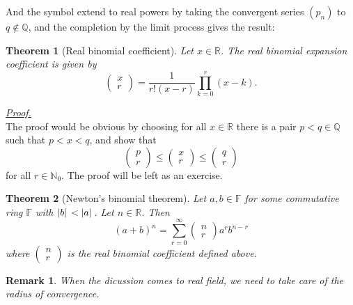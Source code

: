 \documentclass[12pt]{article}
\newtheorem*{theorem}{Theorem}
\newtheorem*{remark}{Remark}
\renewenvironment{proof}[1][Proof]{\begin{snugshade*} \underline{\textit{{#1}.}}\\}{\hfill \qedsymbol \end{snugshade*}}
\begin{document}
    And the symbol extend to real powers by taking the convergent series $(p_n)$ to $q\notin\mathbb{Q}$, and the completion by the limit process gives the result:

    \begin{theorem}[Real binomial coefficient]
        Let $x\in\mathbb{R}$. The real binomial expansion coefficient is given by \[\begin{pmatrix}
            x\\r
        \end{pmatrix}=\frac{1}{r!(x-r)}\prod_{k=0}^{r}(x-k).\]
    \end{theorem}

    \begin{proof}
        The proof would be obvious by choosing for all $x\in \mathbb{R}$ there is a pair $p<q\in\mathbb{Q}$ such that $p<x<q$, and show that \[\begin{pmatrix}
            p\\r
        \end{pmatrix}\leq\begin{pmatrix}
            x\\r
        \end{pmatrix}\leq\begin{pmatrix}
            q\\r
        \end{pmatrix}\] for all $r\in \mathbb{N}_0$. The proof will be left as an exercise.
    \end{proof}

    \begin{theorem}[Newton's binomial theorem]
        Let $a,b\in\mathbb{F}$ for some commutative ring $\mathbb{F}$ with $\abs*{b}< \abs*{a}$. Let $n\in\mathbb{R}$. Then \[(a+b)^n=\sum_{r=0}^{\infty}\begin{pmatrix}
            n\\r
        \end{pmatrix}a^r b^{n-r}\] where $\begin{pmatrix}
            n\\r
        \end{pmatrix}$ is the real binomial coefficient defined above.
    \end{theorem}

    \begin{remark}
        When the dicussion comes to real field, we need to take care of the radius of convergence.
    \end{remark}
\end{document}
